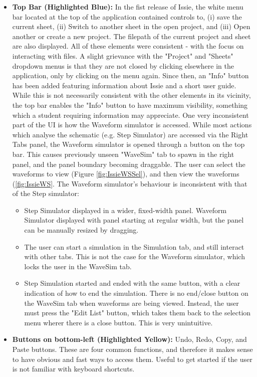 \begin{itemize}
    \item[] \textbf{Top Bar (Highlighted Blue):} In the fist release of Issie, the white menu bar located at the top of the application contained controls to, (i) save the current sheet, (ii) Switch to another sheet in the open project, and (iii) Open another or create a new project. The filepath of the current project and sheet are also displayed. All of these elements were consistent - with the focus on interacting with files. A slight grievance with the "Project" and "Sheets" dropdown menus is that they are not closed by clicking elsewhere in the application, only by clicking on the menu again. Since then, an "Info" button has been added featuring information about Issie and a short user guide. While this is not necessarily consistent with the other elements in its vicinity, the top bar enables the "Info" button to have maximum visibility, something which a student requiring information may appreciate. One very inconsistent part of the UI is how the Waveform simulator is accessed. While most actions which analyse the schematic (e.g. Step Simulator) are accessed via the Right Tabs panel, the Waveform simulator is opened through a button on the top bar. This causes previously unseen "WaveSim" tab to spawn in the right panel, and the panel boundary becoming draggable. The user can select the waveforms to view (Figure \ref{fig:IssieWSSel}), and then view the waveforms (\ref{fig:IssieWS}. The Waveform simulator's behaviour is inconsistent with that of the Step simulator:
    \begin{itemize}
        \item Step Simulator displayed in a wider, fixed-width panel. Waveform Simulator displayed with panel starting at regular width, but the panel can be manually resized by dragging.
        \item The user can start a simulation in the Simulation tab, and still interact with other tabs. This is not the case for the Waveform simulator, which locks the user in the WaveSim tab.
        \item Step Simulation started and ended with the same button, with a clear indication of how to end the simulation. There is no end/close button on the WaveSim tab when waveforms are being viewed. Instead, the user must press the "Edit List" button, which takes them back to the selection menu wherer there is a close button. This is very unintuitive.
    \end{itemize}
    \item[] \textbf{Buttons on bottom-left (Highlighted Yellow):} Undo, Redo, Copy, and Paste buttons. These are four common functions, and therefore it makes sense to have obvious and fast ways to access them. Useful to get started if the user is not familiar with keyboard shortcuts.
\end{itemize}

